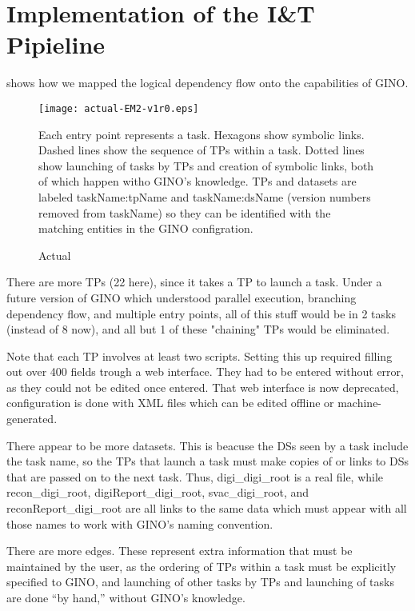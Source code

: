 \documentclass{article}
\begin{document}
\section{Implementation of the I\&T Pipieline}
\label{implement-sec}

{} shows how we mapped the logical dependency flow onto
the capabilities of GINO.

\begin{figure}
\caption{Actual}

\texttt{[image: actual-EM2-v1r0.eps]}

{Each entry point represents a task.  Hexagons show symbolic links. Dashed
lines show the sequence of TPs within a task.  Dotted lines show launching of
tasks by TPs and creation of symbolic links, both of which happen witho GINO's
knowledge.  TPs and datasets are labeled taskName:tpName and taskName:dsName
(version numbers removed from taskName) so they can be identified with the
matching entities in the GINO configration.}

\label{actual-fig}
\end{figure}

There are more TPs (22 here), since it takes a TP to launch a task.  Under a
future version of GINO which understood parallel execution, branching
dependency flow, and multiple entry points, all of this stuff would be in 2
tasks (instead of 8 now), and all but 1 of these "chaining" TPs would be
eliminated.  

Note that each TP involves at least two scripts.  Setting this up required
filling out over 400 fields trough a web interface.  They had to be entered
without error, as they could not be edited once entered.  That web interface
is now deprecated, configuration is done with XML files which can be edited
offline or machine-generated.

There appear to be more datasets.  This is beacuse the DSs seen by a task
include the task name, so the TPs that launch a task must make copies of or
links to DSs that are passed on to the next task.  Thus, digi\_digi\_root is a
real file, while recon\_digi\_root, digiReport\_digi\_root, svac\_digi\_root,
and reconReport\_digi\_root are all links to the same data which must appear
with all those names to work with GINO's naming convention.

There are more edges.  These represent extra information that must be
maintained by the user, as the ordering of TPs within a task must be
explicitly specified to GINO, and launching of other tasks by TPs and
launching of tasks are done ``by hand,'' without GINO's knowledge.
\end{document}
